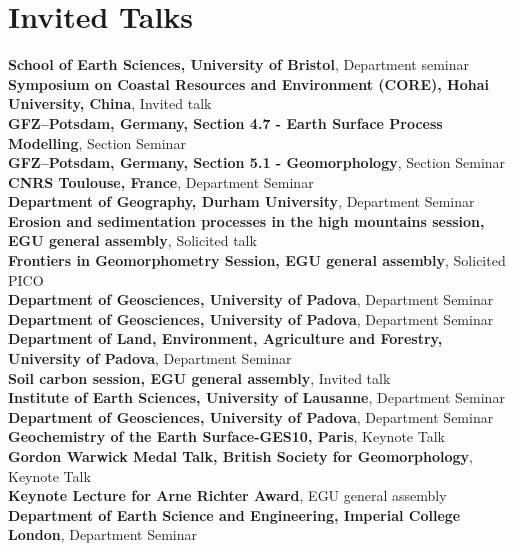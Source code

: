 \documentclass[10pt, a4paper]{article}
\newcommand{\years}[1]{\marginnote{\scriptsize #1}}
\begin{document}
\section*{Invited Talks}
\years{2019}\textbf{School of Earth Sciences, University of Bristol}, Department seminar\\[0.05cm]  
\years{2018}\textbf{Symposium on Coastal Resources and Environment (CORE), Hohai University, China}, Invited talk\\[0.05cm]
\textbf{GFZ--Potsdam, Germany, Section 4.7 - Earth Surface Process Modelling}, Section Seminar\\[0.05cm]
\textbf{GFZ--Potsdam, Germany, Section 5.1 - Geomorphology}, Section Seminar\\[0.05cm]
\years{2017}\textbf{CNRS Toulouse, France}, Department Seminar\\[0.05cm]
\textbf{Department of Geography, Durham University}, Department Seminar\\[0.05cm]
\years{2016}\textbf{Erosion and sedimentation processes in the high mountains session, EGU general assembly}, Solicited talk\\[0.05cm]
\textbf{Frontiers in Geomorphometry Session, EGU general assembly}, Solicited PICO\\[0.05cm]
\textbf{Department of Geosciences, University of Padova}, Department Seminar\\[0.05cm]
\textbf{Department of Geosciences, University of Padova}, Department Seminar\\[0.05cm]
\years{2015}\textbf{Department of Land, Environment, Agriculture and Forestry, University of Padova}, Department Seminar\\[0.05cm]
\years{2014}\textbf{Soil carbon session, EGU general assembly}, Invited talk\\[0.05cm]
\textbf{Institute of Earth Sciences, University of Lausanne}, Department Seminar\\[0.05cm]
\textbf{Department of Geosciences, University of Padova}, Department Seminar\\[0.05cm]
\textbf{Geochemistry of the Earth Surface-GES10, Paris}, Keynote Talk\\[0.05cm]
\textbf{Gordon Warwick Medal Talk, British Society for Geomorphology}, Keynote Talk\\[0.05cm]
\years{2013}\textbf{Keynote Lecture for Arne Richter Award}, EGU general assembly\\[0.05cm]
\textbf{Department of Earth Science and Engineering, Imperial College London},  Department Seminar\\[0.05cm]
\end{document}
